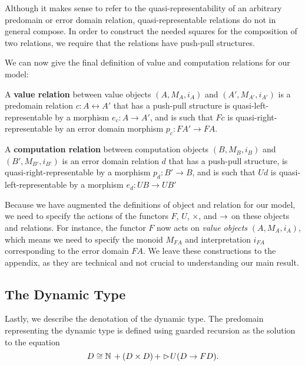 Although it makes sense to refer to the quasi-representability of an arbitrary
predomain or error domain relation, quasi-representable relations do not in
general compose. In order to construct the needed squares for the composition of
two relations, we require that the relations have push-pull structures.

We can now give the final definition of value and computation relations for our
model:
%
\begin{definition}
A \textbf{value relation} between value objects $(A, M_A, i_A)$ and $(A', M_{A'},
i_{A'})$ is a predomain relation $c : A \rel A'$ that has a push-pull structure
is quasi-left-representable by a morphism $e_c : A \to A'$, and is such that
$Fc$ is quasi-right-representable by an error domain morphism $p_c : FA' \to
FA$.
\end{definition}

\begin{definition}
A \textbf{computation relation} between computation objects $(B, M_B, i_B)$ and $(B',
M_{B'}, i_{B'})$ is an error domain relation $d$ that has a push-pull structure,
is quasi-right-representable by a morphism $p_d : B' \to B$, and is such that
$Ud$ is quasi-left-representable by a morphism $e_d : UB \to UB'$
\end{definition}

Because we have augmented the definitions of object and relation for our model,
we need to specify the actions of the functors $F$, $U$, $\times$, and $\to$ on
these objects and relations. For instance, the functor $F$ now acts on
\emph{value objects} $(A, M_A, i_A)$, which means we need to specify the monoid
$M_{FA}$ and interpretation $i_{FA}$ corresponding to the error domain $FA$. We
leave these constructions to the appendix, as they are technical and not crucial
to understanding our main result.




\subsection{The Dynamic Type}
Lastly, we describe the denotation of the dynamic type. The predomain
representing the dynamic type is defined using guarded recursion as the solution
to the equation
%
\[ D \cong \mathbb{N}\, + (D \times D)\, + \vartriangleright \hspace{-0.2em} U(D \to FD). \]
%

